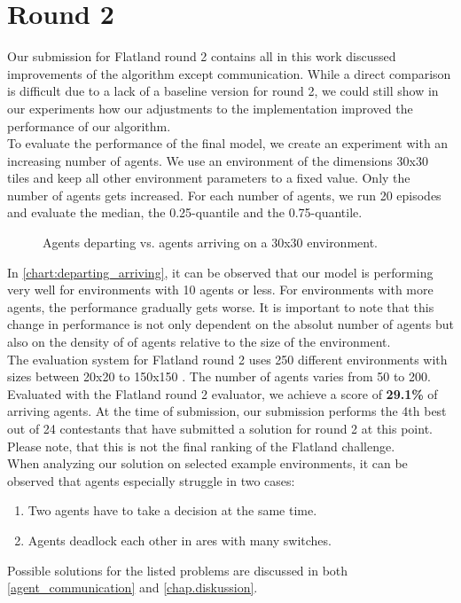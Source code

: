 \section{Round 2}
Our submission for Flatland round 2 contains all in this work discussed improvements of the algorithm except communication. While a direct comparison is difficult due to a lack of a baseline version for round 2, we could still show in our experiments how our adjustments to the implementation improved the performance of our algorithm.\\
To evaluate the performance of the final model, we create an experiment with an increasing number of agents. We use an environment of the dimensions 30x30 tiles and keep all other environment parameters to a fixed value. Only the number of agents gets increased. For each number of agents, we run 20 episodes and evaluate the median, the 0.25-quantile and the 0.75-quantile.
\begin{figure}[H]
	\begin{center}
		
	\end{center}
	\caption{Agents departing vs. agents arriving on a 30x30 environment.}
	\label{chart:departing_arriving}
\end{figure}
In \autoref{chart:departing_arriving}, it can be observed that our model is performing very well for environments with 10 agents or less. For environments with more agents, the performance gradually gets worse. It is important to note that this change in performance is not only dependent on the absolut number of agents but also on the density of of agents relative to the size of the environment.\\
The evaluation system for Flatland round 2 uses 250 different environments with sizes between 20x20 to 150x150 \cite{flatland_faq}. The number of agents varies from 50 to 200.
Evaluated with the Flatland round 2 evaluator, we achieve a score of \textbf{29.1\%} of arriving agents. At the time of submission, our submission performs the 4th best out of 24 contestants that have submitted a solution for round 2 at this point. Please note, that this is not the final ranking of the Flatland challenge.\\
When analyzing our solution on selected example environments, it can be observed that agents especially struggle in two cases:
\begin{enumerate}
	\item Two agents have to take a decision at the same time.
	\item Agents deadlock each other in ares with many switches.
\end{enumerate}
Possible solutions for the listed problems are discussed in both \autoref{agent_communication} and \autoref{chap.diskussion}.







